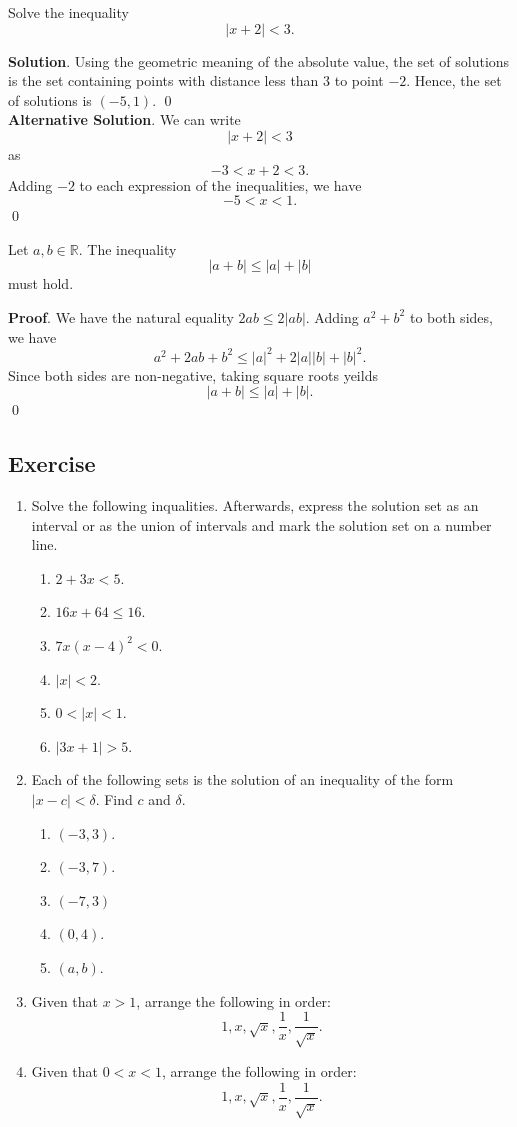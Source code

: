 \documentclass[11pt]{book}
\theoremstyle{break}
\theoremstyle{no_label}
\newcommand{\bbR}{\mathbb{R}}
\numberwithin{equation}{section}
\begin{document}
\begin{example}
    Solve the inequality $$|x+2|<3.$$
\end{example}
\textbf{Solution}. Using the geometric meaning of the absolute value, the set of solutions is the set containing points with distance less than $3$ to point $-2$. Hence, the set of solutions is $(-5, 1)$. \qed\\
\textbf{Alternative Solution}. We can write $$|x+2|<3$$ as $$-3<x+2<3.$$ Adding $-2$ to each expression of the inequalities, we have $$-5<x<1.$$ \qed

\begin{theorem}
    Let $a, b\in\bbR$. The inequality $$|a+b|\leq |a|+|b|$$ must hold.
\end{theorem}
\textbf{Proof}. We have the natural equality $2ab\leq2|ab|$. Adding $a^2+b^2$ to both sides, we have $$a^2+2ab+b^2\leq |a|^2+2|a||b|+|b|^2.$$ Since both sides are non-negative, taking square roots yeilds $$|a+b|\leq |a|+|b|.$$ \qed

\subsection*{Exercise}
\begin{enumerate}[label=\arabic*.]
    \item Solve the following inqualities. Afterwards, express the solution set as an interval or as the union of intervals and mark the solution set on a number line.
    \begin{enumerate}
        \item $2+3x<5$.
        \item $16x+64\leq16$.
        \item $7x(x-4)^2<0$.
        \item $|x|<2$.
        \item $0<|x|<1$.
        \item $|3x+1|>5$.
    \end{enumerate}
    \item Each of the following sets is the solution of an inequality of the form $|x-c|<\delta$. Find $c$ and $\delta$.
    \begin{enumerate}
        \item $(-3, 3)$.
        \item $(-3, 7)$.
        \item $(-7, 3)$
        \item $(0, 4)$.
        \item $(a, b)$.
    \end{enumerate}
    \item Given that $x>1$, arrange the following in order: $$1, x, \sqrt{x}, \dfrac{1}{x}, \dfrac{1}{\sqrt{x}}.$$
    \item Given that $0<x<1$, arrange the following in order: $$1, x, \sqrt{x}, \dfrac{1}{x}, \dfrac{1}{\sqrt{x}}.$$
\end{enumerate}
\end{document}
